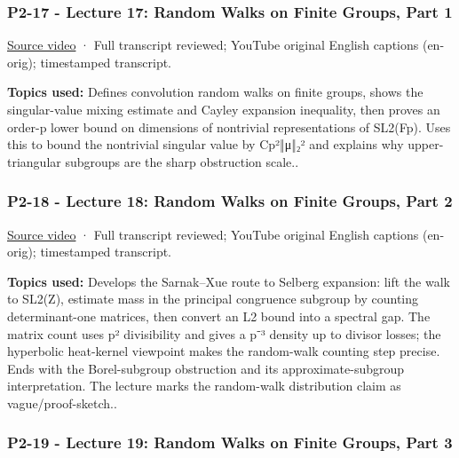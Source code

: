 \subsubsection{P2-17 - Lecture 17: Random Walks on Finite Groups, Part 1}\label{04-visual-computing-ii-ch036-p2-17---lecture-17-random-walks-on-finite-groups-part-1}

\hypertarget{04-visual-computing-ii-ch036-p2-17---lecture-17-random-walks-on-finite-groups-part-1}{}

\href{https://www.youtube.com/watch?v=QVDLMx0Guiw}{Source video} · Full transcript reviewed; YouTube original English captions (en-orig); timestamped transcript.

\textbf{Topics used:} Defines convolution random walks on finite groups, shows the singular-value mixing estimate and Cayley expansion inequality, then proves an order-p lower bound on dimensions of nontrivial representations of SL2(Fp). Uses this to bound the nontrivial singular value by Cp²‖μ‖₂² and explains why upper-triangular subgroups are the sharp obstruction scale..

\subsubsection{P2-18 - Lecture 18: Random Walks on Finite Groups, Part 2}\label{04-visual-computing-ii-ch036-p2-18---lecture-18-random-walks-on-finite-groups-part-2}

\hypertarget{04-visual-computing-ii-ch036-p2-18---lecture-18-random-walks-on-finite-groups-part-2}{}

\href{https://www.youtube.com/watch?v=_jSFwF8rMdY}{Source video} · Full transcript reviewed; YouTube original English captions (en-orig); timestamped transcript.

\textbf{Topics used:} Develops the Sarnak--Xue route to Selberg expansion: lift the walk to SL2(Z), estimate mass in the principal congruence subgroup by counting determinant-one matrices, then convert an L2 bound into a spectral gap. The matrix count uses p² divisibility and gives a p⁻³ density up to divisor losses; the hyperbolic heat-kernel viewpoint makes the random-walk counting step precise. Ends with the Borel-subgroup obstruction and its approximate-subgroup interpretation. The lecture marks the random-walk distribution claim as vague/proof-sketch..

\subsubsection{P2-19 - Lecture 19: Random Walks on Finite Groups, Part 3}\label{04-visual-computing-ii-ch036-p2-19---lecture-19-random-walks-on-finite-groups-part-3}

